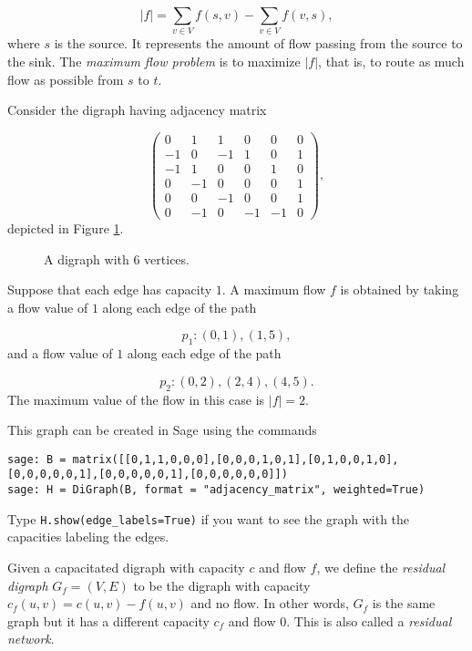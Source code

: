 \[
| f | = \sum_{v\in V}f(s,v)-\sum_{v\in V}f(v,s),
\]
where $s$ is the source.
It represents the amount of flow passing from the source to the sink.
The {\it maximum flow problem} is to maximize $| f |$, that is, to route as
much flow as possible from $s$ to $t$.

\begin{example}
{\rm
Consider the digraph having adjacency matrix

\[
\left(\begin{array}{cccccc}
0 & 1 & 1 & 0 & 0 & 0 \\
-1 & 0 & -1 & 1 & 0 & 1 \\
-1 & 1 & 0 & 0 & 1 & 0 \\
0 & -1 & 0 & 0 & 0 & 1 \\
0 & 0 & -1 & 0 & 0 & 1 \\
0 & -1 & 0 & -1 & -1 & 0
\end{array}\right),
\]
depicted in Figure \ref{fig:digraph-flow1}.

\begin{figure}[!htbp]
\centering

\caption{A digraph with $6$ vertices.}
\label{fig:digraph-flow1}
\end{figure}
Suppose that each edge has capacity $1$.
A maximum flow $f$ is obtained by taking a flow value
of $1$ along each edge of the path

\[
p_1:(0,1),(1,5),
\]
and a flow value
of $1$ along each edge of the path

\[
p_2:(0,2),(2,4),(4,5).
\]
The maximum value of the flow in this case is $|f|=2$.

This graph can be created in Sage using the commands

\begin{lstlisting}
sage: B = matrix([[0,1,1,0,0,0],[0,0,0,1,0,1],[0,1,0,0,1,0],[0,0,0,0,0,1],[0,0,0,0,0,1],[0,0,0,0,0,0]])
sage: H = DiGraph(B, format = "adjacency_matrix", weighted=True)
\end{lstlisting}

\noindent
Type {\tt H.show(edge\_labels=True)} if you want to see the graph with
the capacities labeling the edges.


}
\end{example}


Given a capacitated digraph with capacity $c$ and flow $f$,
we define the {\it residual digraph} $G_f=(V,E)$ to be the
digraph with capacity $c_f(u,v) = c(u,v) - f(u,v)$ and no flow.
In other words, $G_f$ is the same graph but it has a different
capacity $c_f$ and flow $0$.
This is also called a {\it residual network}.

